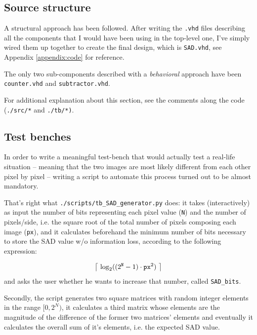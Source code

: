 \documentclass[12pt, a4paper]{article}
\DeclarePairedDelimiter\ceil{\lceil}{\rceil}
\begin{document}
\subsection{Source structure}

A structural approach has been followed.
After writing the \texttt{.vhd} files describing all the components that I would have been using in the top-level one, I've simply wired them up together to create the final design, which is \texttt{SAD.vhd}, see Appendix \ref{appendix:code} for reference.

The only two sub-components described with a \textit{behavioral} approach have been \texttt{counter.vhd} and \texttt{subtractor.vhd}. 

For additional explanation about this section, see the comments along the code (\texttt{./src/*} and \texttt{./tb/*)}.



\subsection{Test benches}

In order to write a meaningful test-bench that would actually test a real-life situation -- meaning that the two images are most likely different from each other pixel by pixel -- writing a script to automate this process turned out to be almost mandatory.

That's right what \texttt{./scripts/tb\_SAD\_generator.py} does: it takes (interactively) as input the number of bits representing each pixel value (\texttt{N}) and the number of pixels/side, i.e. the square root of the total number of pixels composing each image (\texttt{px}), and it calculates beforehand the minimum number of bits necessary to store the SAD value w/o information loss, according to the following expression: 

\begin{equation}
    \ceil[\big]{\ \log_2( (2^\texttt{N}-1) \cdot \texttt{px}^2 )\ } 
\end{equation}
and asks the user whether he wants to increase that number, called \texttt{SAD\_bits}.
\newline

Secondly, the script generates two square matrices with random integer elements in the range $[0, 2^N)$, it calculates a third matrix whose elements are the magnitude of the difference of the former two matrices' elements and eventually it calculates the overall sum of it's elements, i.e. the expected SAD value.
\newline
\end{document}
